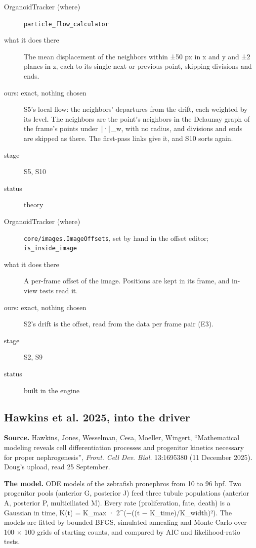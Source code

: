 \begin{description}
\item[{OrganoidTracker (where)}] \texttt{particle\_\allowbreak{}flow\_\allowbreak{}calculator}
\item[{what it does there}] The mean displacement of the neighbors within ±50 px in x and y and ±2 planes in z, each to its single next or previous point, skipping divisions and ends.
\item[{ours: exact, nothing chosen}] S5's local flow: the neighbors' departures from the drift, each weighted by its level. The neighbors are the point's neighbors in the Delaunay graph of the frame's points under ‖·‖\_\allowbreak{}w, with no radius, and divisions and ends are skipped as there. The first-pass links give it, and S10 sorts again.
\item[{stage}] S5, S10
\item[{status}] theory
\end{description}

\begin{description}
\item[{OrganoidTracker (where)}] \texttt{core/\allowbreak{}images.\allowbreak{}Image\allowbreak{}Offsets}, set by hand in the offset editor; \texttt{is\_\allowbreak{}inside\_\allowbreak{}image}
\item[{what it does there}] A per-frame offset of the image. Positions are kept in its frame, and in-view tests read it.
\item[{ours: exact, nothing chosen}] S2's drift is the offset, read from the data per frame pair (E3).
\item[{stage}] S2, S9
\item[{status}] built in the engine
\end{description}

\subsection{\texorpdfstring{Hawkins et al. 2025, into the driver}{Hawkins et al. 2025, into the driver}}

\textbf{Source.} Hawkins, Jones, Wesselman, Cesa, Moeller, Wingert, “Mathematical modeling reveals cell differentiation processes and progenitor kinetics necessary for proper nephrogenesis”, \emph{Front. Cell Dev. Biol.} 13:1695380 (11 December 2025). Doug's upload, read 25 September.

\textbf{The model.} ODE models of the zebrafish pronephros from 10 to 96 hpf. Two progenitor pools (anterior G, posterior J) feed three tubule populations (anterior A, posterior P, multiciliated M). Every rate (proliferation, fate, death) is a Gaussian in time, K(t) = K\_\allowbreak{}max · 2\textasciicircum{}(−((t − K\_\allowbreak{}time)/K\_\allowbreak{}width)²). The models are fitted by bounded BFGS, simulated annealing and Monte Carlo over 100 × 100 grids of starting counts, and compared by AIC and likelihood-ratio tests.

